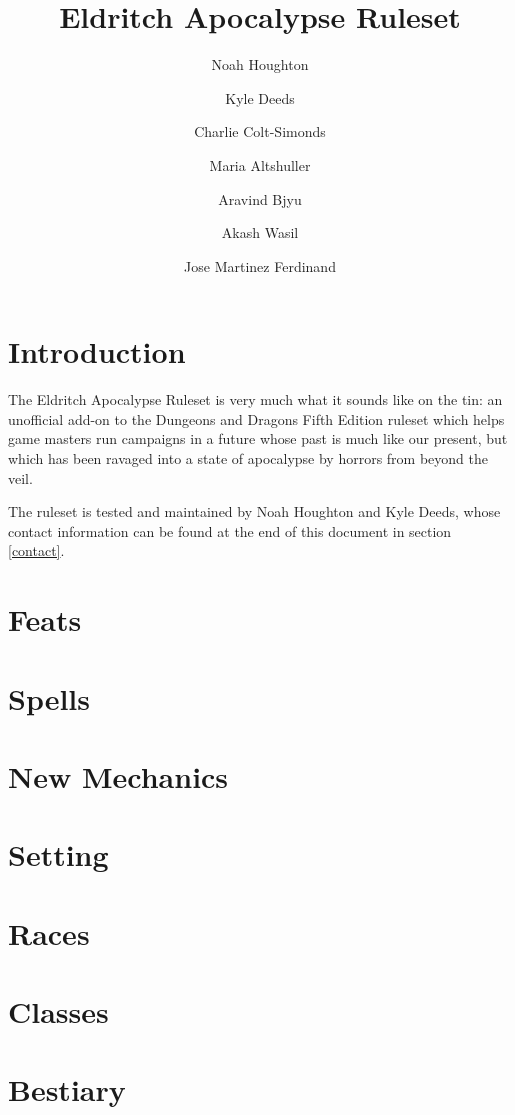 \documentclass[letterpaper,10pt,twoside,twocolumn,openany]{dndbook}
\title{Eldritch Apocalypse Ruleset}
\author{Noah Houghton\and Kyle Deeds\and Charlie Colt-Simonds\and Maria Altshuller\and Aravind Bjyu\and Akash Wasil\and Jose Martinez Ferdinand}
\begin{document}
\maketitle

\tableofcontents

\part{Introduction}
The Eldritch Apocalypse Ruleset is very much what it sounds like on the tin: an unofficial add-on to the Dungeons and Dragons Fifth Edition ruleset which helps game masters run campaigns in a future whose past is much like our present, but which has been ravaged into a state of apocalypse by horrors from beyond the veil.

The ruleset is tested and maintained by Noah Houghton and Kyle Deeds, whose contact information can be found at the end of this document in section \hypertarget{contact}{\ref{contact}}.

\part{Feats}


\part{Spells}


\part{New Mechanics}


\part{Setting}


\part{Races}


\part{Classes}


\part{Bestiary}

\end{document}
